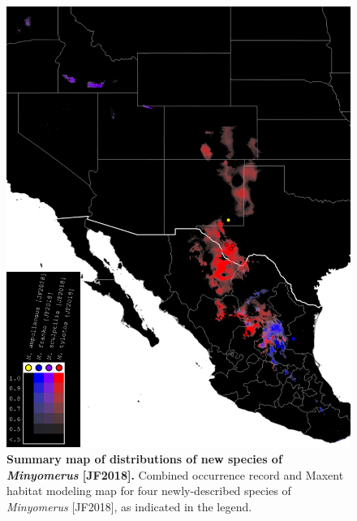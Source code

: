 \documentclass[fleqn,10pt,lineno]{wlpeerj} %
\begin{document}
\begin{figure}[h]
	\centering
	\includegraphics[width=\textwidth]{figure4.png}
	\caption{\textbf{Summary map of distributions of new species of \textit{Minyomerus} [JF2018].} Combined occurrence record and Maxent habitat modeling map for four newly-described species of \textit{Minyomerus} [JF2018], as indicated in the legend.}
	\label{fig:map_summary}
\end{figure}
\end{document}
